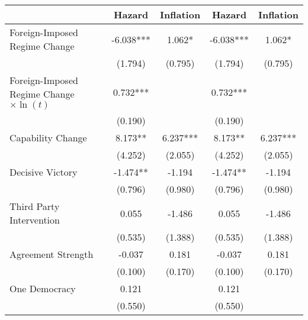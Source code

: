 {
\def\sym#1{\ifmmode^{#1}\else\(^{#1}\)\fi}
\begin{tabular}{l*{4}{c}}
\toprule
                                                            &      Hazard   &   Inflation   &      Hazard   &   Inflation   \\
\midrule
Foreign-Imposed Regime Change                               &      -6.038***&       1.062*  &      -6.038***&       1.062*  \\
                                                            &     (1.794)   &     (0.795)   &     (1.794)   &     (0.795)   \\
Foreign-Imposed Regime Change $\times \ln(t)$               &       0.732***&               &       0.732***&               \\
                                                            &     (0.190)   &               &     (0.190)   &               \\
Capability Change                                           &       8.173** &       6.237***&       8.173** &       6.237***\\
                                                            &     (4.252)   &     (2.055)   &     (4.252)   &     (2.055)   \\
Decisive Victory                                            &      -1.474** &      -1.194   &      -1.474** &      -1.194   \\
                                                            &     (0.796)   &     (0.980)   &     (0.796)   &     (0.980)   \\
Third Party Intervention                                    &       0.055   &      -1.486   &       0.055   &      -1.486   \\
                                                            &     (0.535)   &     (1.388)   &     (0.535)   &     (1.388)   \\
Agreement Strength                                          &      -0.037   &       0.181   &      -0.037   &       0.181   \\
                                                            &     (0.100)   &     (0.170)   &     (0.100)   &     (0.170)   \\
One Democracy                                               &       0.121   &               &       0.121   &               \\
                                                            &     (0.550)   &               &     (0.550)   &               \\

\end{tabular}}
